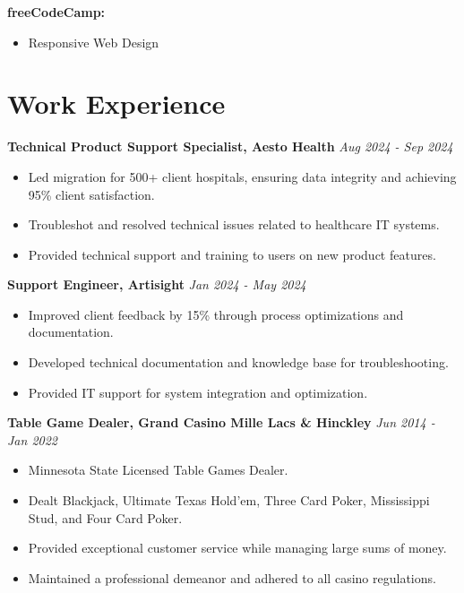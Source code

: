 \documentclass[a4paper,10pt]{article}
\begin{document}
\noindent \textbf{freeCodeCamp:} 
\begin{itemize}[left=2em, label=--]
    \item Responsive Web Design
\end{itemize}


\section*{Work Experience}
\noindent \textbf{Technical Product Support Specialist, Aesto Health} \hfill \textit{Aug 2024 - Sep 2024} \\
\begin{itemize}
    \item Led migration for 500+ client hospitals, ensuring data integrity and achieving 95\% client satisfaction.
    \item Troubleshot and resolved technical issues related to healthcare IT systems.
    \item Provided technical support and training to users on new product features.
\end{itemize}

\noindent \textbf{Support Engineer, Artisight} \hfill \textit{Jan 2024 - May 2024} \\
\begin{itemize}
    \item Improved client feedback by 15\% through process optimizations and documentation.
    \item Developed technical documentation and knowledge base for troubleshooting.
    \item Provided IT support for system integration and optimization.
\end{itemize}

\noindent \textbf{Table Game Dealer, Grand Casino Mille Lacs \& Hinckley} \hfill \textit{Jun 2014 - Jan 2022} \\
\begin{itemize}
    \item Minnesota State Licensed Table Games Dealer.
    \item Dealt Blackjack, Ultimate Texas Hold'em, Three Card Poker, Mississippi Stud, and Four Card Poker.
    \item Provided exceptional customer service while managing large sums of money.
    \item Maintained a professional demeanor and adhered to all casino regulations.
\end{itemize}
\end{document}
